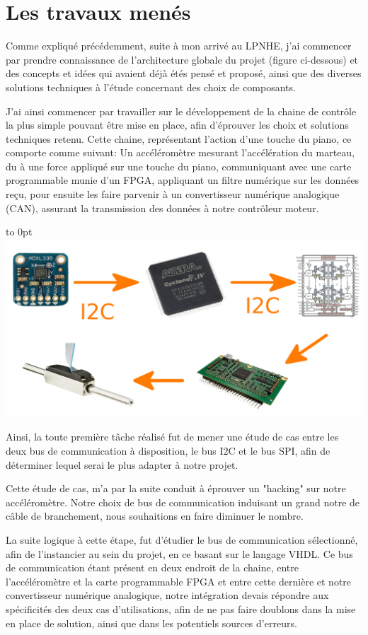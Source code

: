 \documentclass[french,a4paper,12pt]{report}
\begin{document}
	
	\chapter{Les travaux menés}
	
	Comme expliqué précédemment, suite à mon arrivé au LPNHE, j'ai commencer par prendre connaissance de l'architecture globale du projet (figure ci-dessous) et des concepts et idées qui avaient déjà étés pensé et proposé, ainsi que des diverses solutions techniques à l'étude concernant des choix de composants.
	
	J'ai ainsi commencer par travailler sur le développement de la chaine de contrôle la plus simple pouvant être mise en place, afin d'éprouver les choix et solutions techniques retenu.
	Cette chaine, représentant l'action d'une touche du piano, ce comporte comme suivant: Un accéléromètre mesurant l'accélération du marteau, du à une force appliqué sur une touche du piano, communiquant avec une carte programmable munie d'un FPGA, appliquant un filtre numérique sur les données reçu, pour ensuite les faire parvenir à un convertisseur numérique analogique (CAN), assurant la transmission des données à notre contrôleur moteur.
	
	\hfill\hbox to 0pt{\hss\includegraphics[width=17cm]{CH.png}\hss}\hfill\null\newpage
	
	Ainsi, la toute première tâche réalisé fut de mener une étude de cas entre les deux bus de communication à disposition, le bus I2C et le bus SPI, afin de déterminer lequel serai le plus adapter à notre projet.
	
	Cette étude de cas, m'a par la suite conduit à éprouver un "hacking" sur notre accéléromètre. Notre choix de bus de communication induisant un grand notre de câble de branchement, nous souhaitions en faire diminuer le nombre.
	
	La suite logique à cette étape, fut d'étudier le bus de communication sélectionné, afin de l'instancier au sein du projet, en ce basant sur le langage VHDL. Ce bus de communication étant présent en deux endroit de la chaine, entre l'accéléromètre et la carte programmable FPGA et entre cette dernière et notre convertisseur numérique analogique, notre intégration devais répondre aux spécificités des deux cas d'utilisations, afin de ne pas faire doublons dans la mise en place de solution, ainsi que dans les potentiels sources d'erreurs.
	
\end{document}
